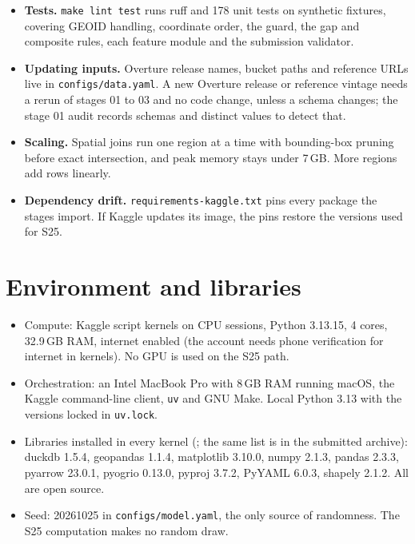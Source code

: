 \documentclass[11pt]{article}
\begin{document}
\begin{itemize}[itemsep=2pt]
\item \textbf{Tests.} \texttt{make lint test} runs ruff and 178 unit tests on
synthetic fixtures, covering GEOID handling, coordinate order, the guard, the
gap and composite rules, each feature module and the submission validator.
\item \textbf{Updating inputs.} Overture release names, bucket paths and
reference URLs live in \texttt{configs/data.yaml}. A new Overture release or
reference vintage needs a rerun of stages 01 to 03 and no code change, unless
a schema changes; the stage 01 audit records schemas and distinct values to
detect that.
\item \textbf{Scaling.} Spatial joins run one region at a time with
bounding-box pruning before exact intersection, and peak memory stays under
7\,GB. More regions add rows linearly.
\item \textbf{Dependency drift.} \texttt{requirements-kaggle.txt} pins every
package the stages import. If Kaggle updates its image, the pins restore the
versions used for S25.
\end{itemize}

\section{Environment and libraries}

\begin{itemize}[itemsep=2pt]
\item Compute: Kaggle script kernels on CPU sessions, Python 3.13.15, 4 cores,
32.9\,GB RAM, internet enabled (the account needs phone verification for
internet in kernels). No GPU is used on the S25 path.
\item Orchestration: an Intel MacBook Pro with 8\,GB RAM running macOS, the
Kaggle command-line client, \texttt{uv} and GNU Make. Local Python 3.13 with
the versions locked in \texttt{uv.lock}.
\item Libraries installed in every kernel (;
the same list is  in the submitted archive): duckdb 1.5.4, geopandas 1.1.4,
matplotlib 3.10.0, numpy 2.1.3, pandas 2.3.3, pyarrow 23.0.1, pyogrio 0.13.0,
pyproj 3.7.2, PyYAML 6.0.3, shapely 2.1.2. All are open source.
\item Seed: 20261025 in \texttt{configs/model.yaml}, the only source of
randomness. The S25 computation makes no random draw.
\end{itemize}
\end{document}
